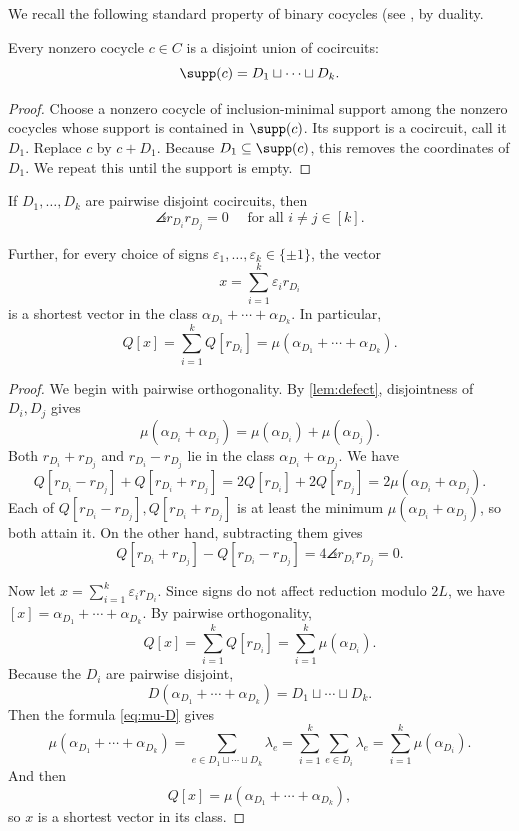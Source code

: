 \documentclass[11pt,letterpaper]{amsart}
\begin{document}
We recall the following standard property of binary cocycles (see \cite[Theorem 9.1]{oxley}, by duality.
\begin{lemma}\label{lem:disjoint-cocircuits}
Every nonzero cocycle $c\in C$ is a disjoint union of cocircuits:
\[
  \supp(c)=D_1\sqcup\cdots\sqcup D_k.
\]
\end{lemma}

\begin{proof}
Choose a nonzero cocycle of inclusion-minimal support among the nonzero cocycles whose support is contained in $\supp(c)$. Its support is a cocircuit, call it $D_1$.  Replace $c$ by $c+D_1$.  Because $D_1\subseteq\supp(c)$, this removes the coordinates of $D_1$.  We repeat this until the support is empty.
\end{proof}

\begin{lemma}\label{lem:orthogonal}
If $D_1,\ldots,D_k$ are pairwise disjoint cocircuits, then
\[
  \angles{r_{D_i}}{r_{D_j}}=0 \quad \text{ for all } i \neq j \in [k].
\]


Further, for every choice of signs
$\varepsilon_1,\ldots,\varepsilon_k\in\{\pm1\}$, the vector
\[
    x=\sum_{i=1}^k \varepsilon_i r_{D_i}
\]
is a shortest vector in the class $\alpha_{D_1}+\cdots+\alpha_{D_k}$. In particular,
\[
    Q[x]
    =
    \sum_{i=1}^k Q[r_{D_i}]
    =
    \mu\left(\alpha_{D_1}+\cdots+\alpha_{D_k}\right).
\]
\end{lemma}

\begin{proof}
We begin with pairwise orthogonality. By \cref{lem:defect}, disjointness of $D_i, D_j$ gives
\[
  \mu(\alpha_{D_i}+\alpha_{D_j})
  =\mu(\alpha_{D_i})+\mu(\alpha_{D_j}).
\]
Both $r_{D_i}+r_{D_j}$ and $r_{D_i}-r_{D_j}$ lie in the class $\alpha_{D_i}+\alpha_{D_j}$.  We have
\[
  Q[r_{D_i} - r_{D_j}] + Q[r_{D_i} + r_{D_j}] = 2Q[r_{D_i}]+2Q[r_{D_j}]
  =2\mu(\alpha_{D_i}+\alpha_{D_j}).
\]
Each of $Q[r_{D_i} - r_{D_j}], Q[r_{D_i} + r_{D_j}]$ is at least the minimum $\mu(\alpha_{D_i}+\alpha_{D_j})$, so both attain it.  On the other hand, subtracting them gives
\[
  Q[r_{D_i} + r_{D_j}] - Q[r_{D_i} - r_{D_j}]  = 4\angles{r_{D_i}}{r_{D_j}} = 0.
\]

Now let $x=\sum_{i=1}^k \varepsilon_i r_{D_i}.$ Since signs do not affect reduction modulo $2L$, we have $[x] = \alpha_{D_1}+\cdots+\alpha_{D_k}.$ By pairwise orthogonality,
\[
    Q[x]
    =
    \sum_{i=1}^k Q[r_{D_i}]
    =
    \sum_{i=1}^k \mu(\alpha_{D_i}).
\]
Because the $D_i$ are pairwise disjoint,
\[
    D\left(\alpha_{D_1}+\cdots+\alpha_{D_k}\right)
    =
    D_1\sqcup\cdots\sqcup D_k.
\]
Then the formula \eqref{eq:mu-D} gives
\[
    \mu\left(\alpha_{D_1}+\cdots+\alpha_{D_k}\right) =
    \sum_{e\in D_1\sqcup\cdots\sqcup D_k}\lambda_e =
    \sum_{i=1}^k\sum_{e\in D_i}\lambda_e =
    \sum_{i=1}^k\mu(\alpha_{D_i}).
\]
And then
\[
    Q[x]
    =
    \mu\left(\alpha_{D_1}+\cdots+\alpha_{D_k}\right),
\]
so $x$ is a shortest vector in its class.

\end{proof}
\end{document}
